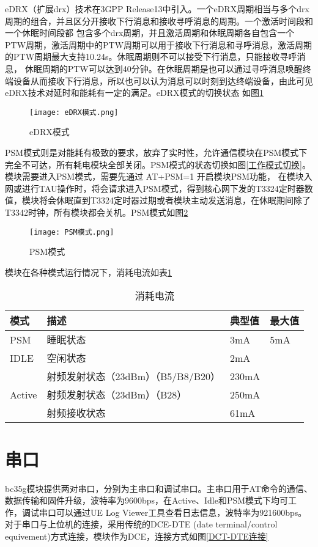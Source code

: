 eDRX（扩展drx）技术在3GPP Release13中引入。一个eDRX周期相当与多个drx周期的组合，并且区分开接收下行消息和接收寻呼消息的周期。一个激活时间段和一个休眠时间段都
包含多个drx周期，并且激活周期和休眠周期各自包含一个PTW周期，激活周期中的PTW周期可以用于接收下行消息和寻呼消息，激活周期的PTW周期最大支持10.24s。休眠周期则不可以接受下行消息，只能接收寻呼消息，
休眠周期的PTW可以达到40分钟。在休眠周期是也可以通过寻呼消息唤醒终端设备从而接收下行消息，所以也可以认为消息可以时刻到达终端设备，由此可见eDRX技术对延时和能耗有一定的满足。eDRX模式的切换状态
如图\ref{eDRX模式}

\begin{figure}[H]
	\centering
	\texttt{[image: eDRX模式.png]}
	\caption{eDRX模式}
	\label{eDRX模式}
\end{figure}

PSM模式则是对能耗有极致的要求，放弃了实时性，允许通信模块在PSM模式下完全不可达，所有耗电模块全部关闭。PSM模式的状态切换如图\ref{工作模式切换}。模块需要进入PSM模式，需要先通过 AT+PSM=1 开启模块PSM功能，
在模块入网或进行TAU操作时，将会请求进入PSM模式，得到核心网下发的T3324定时器数值，模块将会休眠直到T3324定时器过期或者模块主动发送消息，在休眠期间除了T3342时钟，所有模块都会关机。PSM模式如图\ref{PSM模式}

\begin{figure}[H]
	\centering
	\texttt{[image: PSM模式.png]}
	\caption{PSM模式}
	\label{PSM模式}
\end{figure}

模块在各种模式运行情况下，消耗电流如表\ref{消耗电流}

\begin{table}[h!]
\caption{消耗电流}
\begin{tabular}{llll}
\toprule
  模式 & 描述 & 典型值 & 最大值\\
 \hline
 PSM & 睡眠状态 & 3mA & 5mA \\
 IDLE  & 空闲状态 & 2mA & \\
 \multirow{3}{*}{Active} & 射频发射状态（23dBm）（B5/B8/B20） & 230mA & \\
 & 射频发射状态（23dBm）（B28） & 250mA & \\
 & 射频接收状态 & 61mA & \\
\bottomrule
\end{tabular}
\label{消耗电流}
\end{table}

\section{串口}
bc35g模块提供两对串口，分别为主串口和调试串口。主串口用于AT命令的通信、数据传输和固件升级，波特率为9600bps，在Active、Idle和PSM模式下均可工作，调试串口可以通过UE Log Viewer工具查看日志信息，波特率为921600bps。对于串口与上位机的连接，采用传统的DCE-DTE
(date terminal/control equivement)方式连接，模块作为DCE，连接方式如图\ref{DCT-DTE连接}

